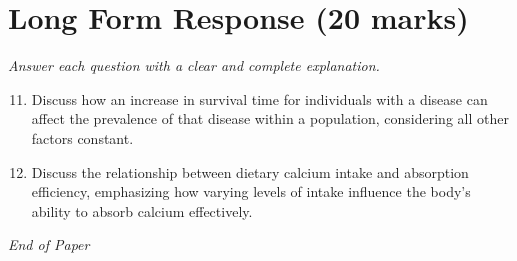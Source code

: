 \documentclass[12pt]{article}
\begin{document}
\section*{Long Form Response (20 marks)}
\textit{Answer each question with a clear and complete explanation.}
\begin{enumerate}[label=\arabic*.]
\setcounter{enumi}{10}
\item Discuss how an increase in survival time for individuals with a disease can affect the prevalence of that disease within a population, considering all other factors constant.
\item Discuss the relationship between dietary calcium intake and absorption efficiency, emphasizing how varying levels of intake influence the body's ability to absorb calcium effectively.
\end{enumerate}

\vfill
\noindent\textit{End of Paper}
\end{document}
